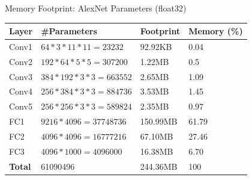 \begin{frame}{Memory Footprint: AlexNet Parameters (float32)}
	\begin{table}[H]
		\centering
		\begin{tabular}{llll}
			\toprule
			\textbf{Layer} & \textbf{\#Parameters}        & \textbf{Footprint} & \textbf{Memory (\%)} \\
			\midrule
			Conv1          & $64 * 3 * 11 * 11 = 23232$   & 92.92KB            & 0.04                 \\
			Conv2          & $192 * 64 * 5 * 5 = 307200$  & 1.22MB             & 0.5                  \\
			Conv3          & $384 * 192 * 3 * 3 = 663552$ & 2.65MB             & 1.09                 \\
			Conv4          & $256 * 384 * 3 * 3 = 884736$ & 3.53MB             & 1.45                 \\
			Conv5          & $256 * 256 * 3 * 3 = 589824$ & 2.35MB             & 0.97                 \\
			FC1            & $9216 * 4096 = 37748736$     & 150.99MB           & 61.79                \\
			FC2            & $4096 * 4096 = 16777216$     & 67.10MB            & 27.46                \\
			FC3            & $4096 * 1000 = 4096000$      & 16.38MB            & 6.70                 \\
			\midrule
			\textbf{Total} & 61090496                     & 244.36MB           & 100                  \\
			\bottomrule
		\end{tabular}
	\end{table}
\end{frame}

